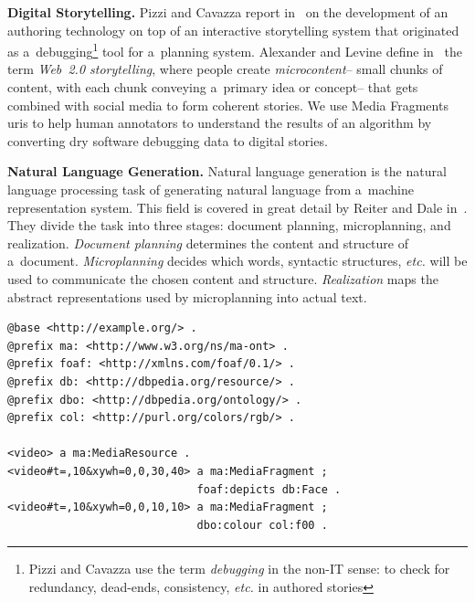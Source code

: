\documentclass{article}
\begin{document}
\noindent \textbf{Digital Storytelling.} Pizzi and Cavazza report in~\cite{pizzi2008debugging} on the development of an authoring technology on top of an interactive storytelling system that originated as a~debugging\footnote{Pizzi and Cavazza use the term \emph{debugging} in the non-IT sense: to check for redundancy, dead-ends, consistency, \emph{etc.} in authored stories} tool for a~planning system. Alexander and Levine define in~\cite{alexander2008storytelling}
the term \emph{Web~2.0 storytelling}, where people create \emph{microcontent}--%
small chunks of content, with each chunk conveying a~primary idea or concept--%
that gets combined with social media to form coherent stories. We use Media Fragments {\sc uri}s to help human annotators to understand the results of an algorithm by converting dry software debugging data to digital stories.

\noindent \textbf{Natural Language Generation.} Natural language generation is the natural language processing task of generating natural language from a~machine representation system. This field is covered in great detail by Reiter and Dale in~\cite{reiter2000building}. They divide the task into three stages: document planning, microplanning, and realization. \emph{Document planning} determines the content and structure of a~document. \emph{Microplanning} decides which words, syntactic structures, \emph{etc.} will be used to communicate the chosen content and structure. \emph{Realization} maps the abstract representations
used by microplanning into actual text.

\begin{lstlisting}[caption={Description of two 10~sec long media fragments:
  \textit{(i)}~a~tile of dimensions $ 30 \times 40 $ pixels
  starting at pixel coordinates $ (0, 0) $
  that contains a~face; and
  \textit{(ii)}~a~tile of dimensions $ 10 \times 10 $ pixels
  starting at pixel coordinates $ (0, 0) $ of red color},
  label=code:media-fragment, float=b!]
@base <http://example.org/> .
@prefix ma: <http://www.w3.org/ns/ma-ont> .
@prefix foaf: <http://xmlns.com/foaf/0.1/> .
@prefix db: <http://dbpedia.org/resource/> .
@prefix dbo: <http://dbpedia.org/ontology/> .
@prefix col: <http://purl.org/colors/rgb/> .

<video> a ma:MediaResource .
<video#t=,10&xywh=0,0,30,40> a ma:MediaFragment ;
                             foaf:depicts db:Face .
<video#t=,10&xywh=0,0,10,10> a ma:MediaFragment ;
                             dbo:colour col:f00 .
\end{lstlisting}
\end{document}
